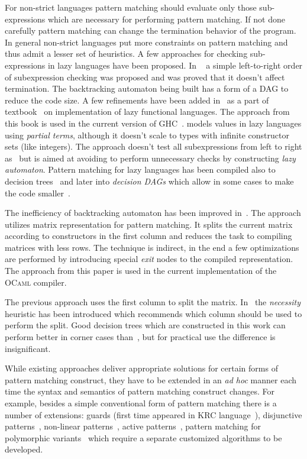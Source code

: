 For non-strict languages pattern matching should evaluate only those sub-expressions which are necessary for performing pattern matching. If not done carefully pattern matching can
change the termination behavior of the program. In general non-strict languages put more constraints on pattern matching and thus admit a lesser set of heuristics. 
A few approaches for checking sub-expressions in lazy languages have been proposed. In ~\cite{augustsson1985} a simple left-to-right order of subexpression checking was proposed
and was proved that it doesn't affect termination. The backtracking automaton being built has a form of a DAG to reduce the code size. A few refinements have been added in~\cite{wadler1987}
as a part of textbook~\cite{peytonjones1987} on implementation of lazy functional languages. The approach from this book is used in the current version of GHC~\cite{ghc}.
\cite{laville1991} models values in lazy languages using \emph{partial terms}, although it doesn't scale to types with infinite constructor sets (like integers). The approach doesn't
test all subexpressions from left to right as~\cite{augustsson1985} but is aimed at avoiding to perform unnecessary checks by constructing \emph{lazy automaton}. Pattern matching for
lazy languages has been compiled also to decision trees~\cite{maranget1992} and later into \emph{decision DAGs} which allow in some cases to make the code
smaller~\cite{maranget1994}.

The inefficiency of backtracking automaton has been
improved in~\cite{maranget2001}. The approach utilizes matrix representation for pattern matching. It splits the current matrix according to constructors in the
first column and reduces the task to compiling matrices with less rows. The technique is indirect, in the end a few optimizations are performed by introducing
special \emph{exit} nodes to the compiled representation. %
The approach from this paper is used in the current implementation of the \textsc{OCaml} compiler.

The previous approach uses the first column to split the matrix. In~\cite{maranget2008} the \emph{necessity} heuristic has been introduced which recommends which column should be
used to perform the split. Good decision trees which are constructed in this work can perform better in corner cases than~\cite{maranget2001}, but for practical use the
difference is insignificant.

While existing approaches deliver appropriate solutions for certain forms of pattern matching construct, they have to be extended in an \emph{ad hoc} manner each time
the syntax and semantics of pattern matching construct changes. For example, besides a simple conventional form of pattern matching there is a number of extensions:
guards (first time appeared in KRC language~\cite{turner2013}), disjunctive patterns~\cite{?}, non-linear patterns~\cite{mcbride1969symbol}, active patterns~\cite{activepatterns}, pattern matching for polymorphic variants~\cite{Garrigue98} 
which require a separate customized algorithms to be developed.

